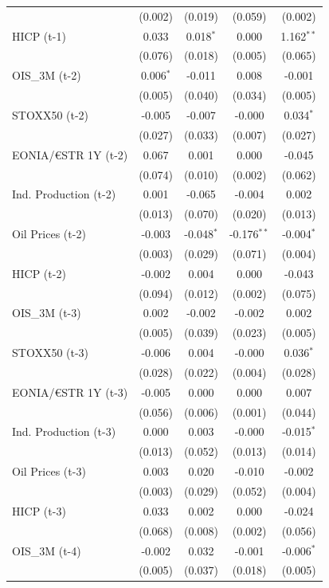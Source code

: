 \begin{longtable}[t]{lcccc}
 & (0.002) & (0.019) & (0.059) & (0.002)\\
HICP (t-1) & 0.033 & 0.018$^{*}$ & 0.000 & 1.162$^{**}$\\
 & (0.076) & (0.018) & (0.005) & (0.065)\\
OIS\_3M (t-2) & 0.006$^{*}$ & -0.011 & 0.008 & -0.001\\
 & (0.005) & (0.040) & (0.034) & (0.005)\\
STOXX50 (t-2) & -0.005 & -0.007 & -0.000 & 0.034$^{*}$\\
 & (0.027) & (0.033) & (0.007) & (0.027)\\
EONIA/€STR 1Y (t-2) & 0.067 & 0.001 & 0.000 & -0.045\\
 & (0.074) & (0.010) & (0.002) & (0.062)\\
Ind. Production (t-2) & 0.001 & -0.065 & -0.004 & 0.002\\
 & (0.013) & (0.070) & (0.020) & (0.013)\\
Oil Prices (t-2) & -0.003 & -0.048$^{*}$ & -0.176$^{**}$ & -0.004$^{*}$\\
 & (0.003) & (0.029) & (0.071) & (0.004)\\
HICP (t-2) & -0.002 & 0.004 & 0.000 & -0.043\\
 & (0.094) & (0.012) & (0.002) & (0.075)\\
OIS\_3M (t-3) & 0.002 & -0.002 & -0.002 & 0.002\\
 & (0.005) & (0.039) & (0.023) & (0.005)\\
STOXX50 (t-3) & -0.006 & 0.004 & -0.000 & 0.036$^{*}$\\
 & (0.028) & (0.022) & (0.004) & (0.028)\\
EONIA/€STR 1Y (t-3) & -0.005 & 0.000 & 0.000 & 0.007\\
 & (0.056) & (0.006) & (0.001) & \vphantom{1} (0.044)\\
Ind. Production (t-3) & 0.000 & 0.003 & -0.000 & -0.015$^{*}$\\
 & (0.013) & (0.052) & (0.013) & (0.014)\\
Oil Prices (t-3) & 0.003 & 0.020 & -0.010 & -0.002\\
 & (0.003) & (0.029) & (0.052) & (0.004)\\
HICP (t-3) & 0.033 & 0.002 & 0.000 & -0.024\\
 & (0.068) & (0.008) & (0.002) & (0.056)\\
OIS\_3M (t-4) & -0.002 & 0.032 & -0.001 & -0.006$^{*}$\\
 & (0.005) & (0.037) & (0.018) & (0.005)\\

\end{longtable}
